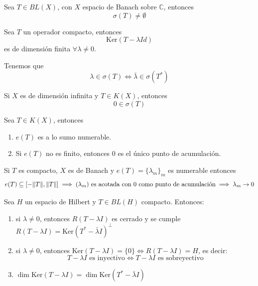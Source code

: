 \documentclass[12pt]{book}
\begin{document}
\begin{teo}
    Sea $T \in BL(X)$, con $X$ espacio de Banach sobre $\mathbb{C}$, entonces 
    $$\sigma(T) \neq \emptyset$$
\end{teo}

\begin{teo}
    Sea $T$ un operador compacto, entonces 
    $$\text{Ker}(T - \lambda Id)$$
    es de dimensión finita $\forall \lambda \neq 0$.
\end{teo}

\begin{prop}
    Tenemos que
    \begin{equation*}
        \lambda \in \sigma(T) \iff \bar{\lambda} \in \sigma(T^*)
    \end{equation*}
\end{prop}

\begin{prop}
    Si $X$ es de dimensión infinita y $T \in K(X)$, entonces 
    $$0 \in \sigma(T)$$
\end{prop}

\begin{teo}
    Sea $T \in K(X)$, entonces
    \begin{enumerate}
        \item[i)] $e(T)$ es a lo sumo numerable.
        \item[ii)] Si $e(T)$ no es finito, entonces $0$ es el único punto de acumulación.
    \end{enumerate}
\end{teo}

\begin{observacion}
    Si $T$ es compacto, $X$ es de Banach y  $e(T) = \{\lambda_m\}_m$ es numerable entonces 
    \begin{equation*}
            e(T) \subseteq [-\|T\|, \|T\|] \implies (\lambda_m) \text{ es acotada con } 0 \text{ como punto de acumulación} \implies \lambda_m \to 0 \\
    \end{equation*}
\end{observacion}

\begin{teo} \label{teo:fredholm}
    Sea $H$ un espacio de Hilbert y $T \in BL(H)$ compacto. Entonces:
    \begin{enumerate}
        \item[a)] si $\lambda \neq 0$, entonces $R(T - \lambda I)$ es cerrado y se cumple $R(T - \lambda I) = \text{Ker}(T^* - \bar{\lambda} I)^\perp$
        \item[b)] si $\lambda \neq 0$, entonces $\text{Ker}(T - \lambda I) = \{0\} \iff R(T - \lambda I) = H$, es decir:
        \[ T - \lambda I \text{ es inyectivo} \iff T - \lambda I \text{ es sobreyectivo} \]
        \item[c)] $\dim \text{Ker}(T - \lambda I) = \dim \text{Ker}(T^* - \bar{\lambda} I)$
    \end{enumerate}
\end{teo}
\end{document}
